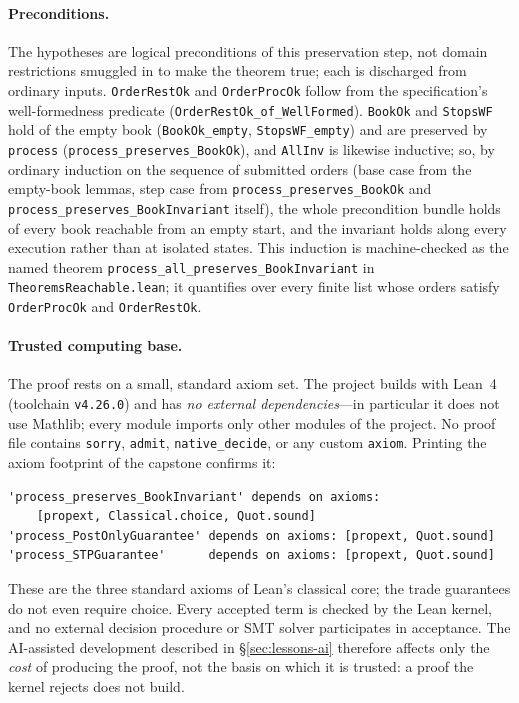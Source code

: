 \documentclass[11pt,a4paper]{article}
\begin{document}
\paragraph{Preconditions.} The hypotheses are logical preconditions of
this preservation step, not domain restrictions smuggled in to make the
theorem true; each is discharged from ordinary inputs.
\texttt{OrderRestOk} and \texttt{OrderProcOk} follow from the
specification's well-formedness predicate
(\texttt{OrderRestOk\_of\_WellFormed}). \texttt{BookOk} and
\texttt{StopsWF} hold of the empty book (\texttt{BookOk\_empty},
\texttt{StopsWF\_empty}) and are preserved by \texttt{process}
(\texttt{process\_preserves\_BookOk}), and \texttt{AllInv} is likewise
inductive; so, by ordinary induction on the sequence of submitted
orders (base case from the empty-book lemmas, step case from
\texttt{process\_preserves\_BookOk} and
\texttt{process\_preserves\_BookInvariant} itself), the whole
precondition bundle holds of every book reachable from an empty start,
and the invariant holds along every execution rather than at isolated
states. This induction is machine-checked as the named theorem
\texttt{process\_all\_preserves\_BookInvariant} in
\texttt{TheoremsReachable.lean}; it quantifies over every finite list
whose orders satisfy \texttt{OrderProcOk} and \texttt{OrderRestOk}.

\paragraph{Trusted computing base.} The proof rests on a small, standard
axiom set. The project builds with Lean~4 (toolchain \texttt{v4.26.0})
and has \emph{no external dependencies}---in particular it does not use
Mathlib; every module imports only other modules of the project. No
proof file contains \texttt{sorry}, \texttt{admit},
\texttt{native\_decide}, or any custom \texttt{axiom}. Printing the axiom
footprint of the capstone confirms it:

\begin{lstlisting}[language={},basicstyle=\ttfamily\footnotesize]
'process_preserves_BookInvariant' depends on axioms:
    [propext, Classical.choice, Quot.sound]
'process_PostOnlyGuarantee' depends on axioms: [propext, Quot.sound]
'process_STPGuarantee'      depends on axioms: [propext, Quot.sound]
\end{lstlisting}

\noindent These are the three standard axioms of Lean's classical core;
the trade guarantees do not even require choice. Every accepted term is
checked by the Lean kernel, and no external decision procedure or SMT
solver participates in acceptance. The AI-assisted development described
in \S\ref{sec:lessons-ai} therefore affects only the \emph{cost} of
producing the proof, not the basis on which it is trusted: a proof the
kernel rejects does not build.
\end{document}
